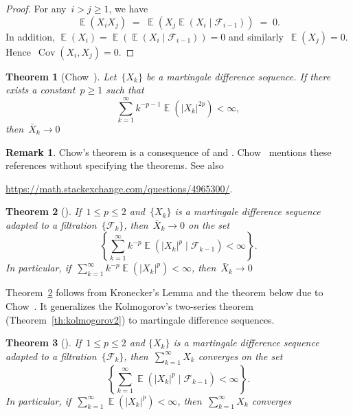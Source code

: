 \documentclass[12pt,a4paper]{article}  %
\newcounter{cite}
\newtheorem{theorem}{Theorem}[section]
\theoremstyle{definition}
\newtheorem{remark}{Remark}[section]
\numberwithin{equation}{section}
\newcommand{\FF}{\mathcal{F}}
\newcommand{\as}{{\text{a.s.}}\xspace}
\DeclareMathOperator{\cov}{Cov}
\DeclareMathOperator{\expc}{\mathbb{E}}
\begin{document}
\begin{proof}
    For any~$i > j \ge 1$, we have
    \[
        \expc(X_iX_j) \;=\;  \expc(X_j\expc(X_i\mathrel{|}\FF_{i-1})) \;=\; 0.
    \]
    In addition, $\expc(X_i) = \expc(\expc(X_i\mathrel{|}\FF_{i-1})) = 0$ and
    similarly~$\expc(X_j) = 0$. Hence~$\cov(X_i, X_j) = 0$.
\end{proof}

\begin{theorem}[Chow~\cite{Chow_1967}]
    \label{th:sllnmd1}
    Let~$\{X_k\}$ be a martingale difference sequence. If there exists a constant~$p\ge 1$ such that
   \[
       \sum_{k=1}^\infty k^{-p-1} \expc(|X_k|^{2p}) < \infty,
   \]
   then~$\bar{X}_k \to 0$ \as
\end{theorem}

\begin{remark}
    \label{rem:chow}
    Chow's theorem is a consequence of \cite[Theorem~2]{Chow_1960} and
    \cite[Theorem~9]{Burkholder_1966}. Chow~\cite{Chow_1967} mentions these references without
    specifying the theorems. See also
    \begin{center}
    \url{https://math.stackexchange.com/questions/4965300/}.
    \end{center}
\end{remark}

\begin{theorem}[\mbox{\cite[Theorem~2.18]{Hall_Heyde_1980}}]
    \label{th:sllnmd2}
    If~$1\le p\le 2$ and~$\{X_k\}$ is a martingale difference sequence adapted to a filtration~$\{\FF_k\}$,
    then~$\bar{X}_k \to 0$ \as on the set
   \[
       \left\{ \sum_{k=1}^\infty k^{-p} \expc(|X_k|^p
       \mathrel{|} \FF_{k-1}) < \infty \right\}.
   \]
   In particular, if~$\sum_{k=1}^\infty k^{-p} \expc(|X_k|^p) < \infty$, then~$\bar{X}_k \to 0$ \as
\end{theorem}

Theorem~\ref{th:sllnmd2} follows from Kronecker's Lemma and the theorem below due to
Chow~\cite{Chow_1965}. It generalizes the Kolmogorov's two-series theorem
(Theorem~\ref{th:kolmogorov2}) to martingale difference sequences.

\begin{theorem}[\mbox{\cite[Corollary~5]{Chow_1965}}]
    \label{th:kolmogorov2c}
    If~$1\le p\le 2$ and $\{X_k\}$ is a martingale difference sequence adapted to a filtration~$\{\FF_k\}$,
    then~$\sum_{k=1}^\infty X_k$ converges \as on the set
    \[
    \left\{\sum_{k=1}^\infty \expc(|X_k|^p\mathrel{|}\FF_{k-1}) < \infty\right\}.
    \]
    In particular, if~$\sum_{k=1}^\infty \expc(|X_k|^p) < \infty$, then~$\sum_{k=1}^\infty X_k$
    converges \as
\end{theorem}
\end{document}
